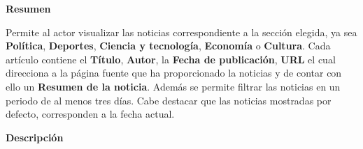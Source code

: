 

\begin{large}
	\textbf{Resumen}\\
\end{large}

Permite al actor visualizar las noticias correspondiente a la sección elegida, ya sea \textbf{Política}, \textbf{Deportes}, \textbf{Ciencia y tecnología}, \textbf{Economía} o \textbf{Cultura}. Cada artículo contiene el \textbf{Título}, \textbf{Autor}, la \textbf{Fecha de publicación}, \textbf{URL} el cual direcciona a la página fuente que ha proporcionado la noticias y de contar con ello un \textbf{Resumen de la noticia}. Además se permite filtrar las noticias en un periodo de al menos tres días. Cabe destacar que las noticias mostradas por defecto, corresponden a la fecha actual.\\

\begin{large}
	\textbf{Descripción}\\
\end{large}




